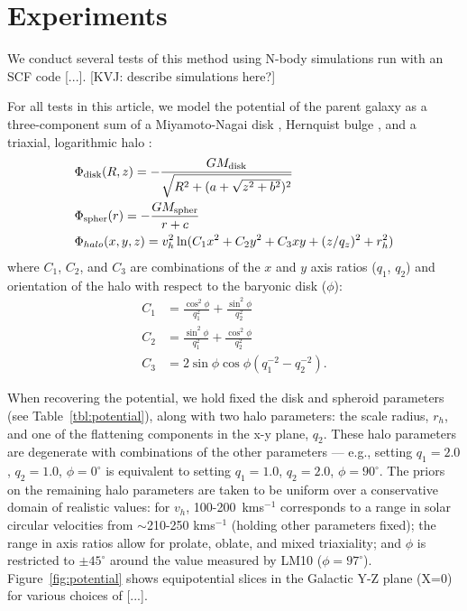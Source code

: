 \documentclass[letterpaper,12pt,preprint]{aastex}
\begin{document}
\section{Experiments}
We conduct several tests of this method using N-body simulations run with an SCF code [...]. [KVJ: describe simulations here?] 

For all tests in this article, we model the potential of the parent galaxy as a three-component sum of a Miyamoto-Nagai disk \citep{}, Hernquist bulge \citep[spheroid;][]{}, and a triaxial, logarithmic halo \citep[e.g.,][]{law10}:
\begin{align}
	&\Phi_{\rm disk}(R,z) = -\frac{GM_{\rm disk}}{\sqrt{R^2 + (a + \sqrt{z^2 + b^2})^2}}\\
	&\Phi_{\rm spher}(r) = -\frac{GM_{\rm spher}}{r + c}\\
	&\Phi_{halo}(x,y,z) = v_{h}^2 \ln(C_1 x^2 + C_2 y^2 + C_3 xy + (z/q_z)^2 + r_h^2)
\end{align}
where $C_1$, $C_2$, and $C_3$ are combinations of the $x$ and $y$ axis
ratios ($q_1$, $q_2$) and orientation of the halo with respect to the
baryonic disk ($\phi$):
\begin{align}
  C_1 &= \frac{\cos^2\phi}{q_1^2} + \frac{\sin^2\phi}{q_2^2}\\
  C_2 &= \frac{\sin^2\phi}{q_1^2} + \frac{\cos^2\phi}{q_2^2}\\
  C_3 &= 2\sin\phi\cos\phi \left(q_1^{-2} - q_2^{-2}\right).
\end{align}

When recovering the potential, we hold fixed the disk and spheroid parameters (see Table~\ref{tbl:potential}), along with two halo parameters: the scale radius, $r_h$, and one of the flattening components in the x-y plane, $q_2$. These halo parameters are degenerate with combinations of the other parameters --- e.g., setting $q_1=2.0$, $q_2=1.0$, $\phi=0^\circ$ is equivalent to setting $q_1=1.0$, $q_2=2.0$, $\phi=90^\circ$. The priors on the remaining halo parameters are taken to be uniform over a conservative domain of realistic values: for $v_h$, 100-200~kms$^{-1}$ corresponds to a range in solar circular velocities from $\sim$210-250 kms$^{-1}$ (holding other parameters fixed); the range in axis ratios allow for prolate, oblate, and mixed triaxiality; and $\phi$ is restricted to $\pm45^\circ$ around the value measured by LM10 ($\phi = 97^\circ$). Figure~\ref{fig:potential} shows equipotential slices in the Galactic Y-Z plane (X=0) for various choices of [...].
\end{document}

